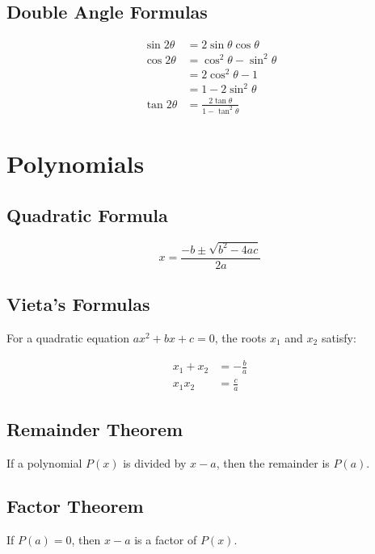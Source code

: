 \documentclass[12pt]{article}
\begin{document}
\subsection*{Double Angle Formulas}
\begin{align}
  \sin 2\theta &= 2 \sin \theta \cos \theta \\
  \cos 2\theta &= \cos^2 \theta - \sin^2 \theta \\
               &= 2 \cos^2 \theta - 1 \\
               &= 1 - 2 \sin^2 \theta \\
  \tan 2\theta &= \frac{2 \tan \theta}{1 - \tan^2 \theta}
\end{align}

\section{Polynomials}

\subsection*{Quadratic Formula}
\begin{equation}
  x = \frac{-b \pm \sqrt{b^2 - 4ac}}{2a}
\end{equation}

\subsection*{Vieta's Formulas}
For a quadratic equation $ax^2 + bx + c = 0$, the roots $x_1$ and $x_2$ satisfy:

\begin{align}
  x_1 + x_2 &= -\frac{b}{a} \\
  x_1 x_2 &= \frac{c}{a}
\end{align}

\vspace{1cm}
\noindent
\begin{minipage}[t]{0.45\textwidth}
\subsection*{Remainder Theorem}
If a polynomial $P(x)$ is divided by $x-a$, then the remainder is $P(a)$.
\end{minipage}%
\hfill
\begin{minipage}[t]{0.45\textwidth}
\subsection*{Factor Theorem}
If $P(a) = 0$, then $x-a$ is a factor of $P(x)$.
\end{minipage}
\end{document}
